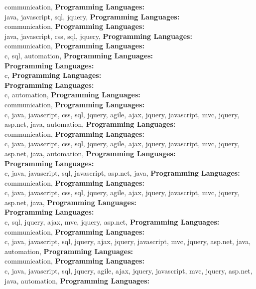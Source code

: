communication, \textbf{Programming Languages:} \\
java, javascript, sql, jquery, \textbf{Programming Languages:} \\
communication, \textbf{Programming Languages:} \\
java, javascript, css, sql, jquery, \textbf{Programming Languages:} \\
communication, \textbf{Programming Languages:} \\
c, sql, automation, \textbf{Programming Languages:} \\
\textbf{Programming Languages:} \\
c, \textbf{Programming Languages:} \\
\textbf{Programming Languages:} \\
c, automation, \textbf{Programming Languages:} \\
communication, \textbf{Programming Languages:} \\
c, java, javascript, css, sql, jquery, agile, ajax,  jquery, javascript, mvc, jquery, asp.net, java, automation, \textbf{Programming Languages:} \\
communication, \textbf{Programming Languages:} \\
c, java, javascript, css, sql, jquery, agile, ajax,  jquery, javascript, mvc, jquery, asp.net, java, automation, \textbf{Programming Languages:} \\
\textbf{Programming Languages:} \\
c, java, javascript, sql, javascript, asp.net, java, \textbf{Programming Languages:} \\
communication, \textbf{Programming Languages:} \\
c, java, javascript, css, sql, jquery, agile, ajax,  jquery, javascript, mvc, jquery, asp.net, java, \textbf{Programming Languages:} \\
\textbf{Programming Languages:} \\
c, sql, jquery, ajax, mvc, jquery, asp.net, \textbf{Programming Languages:} \\
communication, \textbf{Programming Languages:} \\
c, java, javascript, sql, jquery, ajax,  jquery, javascript, mvc, jquery, asp.net, java, automation, \textbf{Programming Languages:} \\
communication, \textbf{Programming Languages:} \\
c, java, javascript, sql, jquery, agile, ajax,  jquery, javascript, mvc, jquery, asp.net, java, automation, \textbf{Programming Languages:} \\
